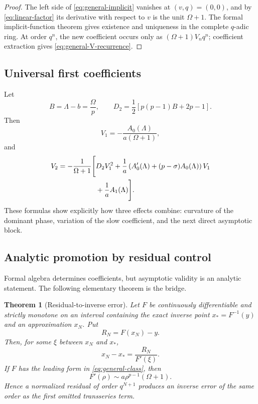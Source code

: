 \documentclass[11pt,a4paper]{article}
\numberwithin{equation}{section}
\newtheorem{theorem}{Theorem}[section]
\theoremstyle{remark}
\begin{document}
\begin{proof}
The left side of \cref{eq:general-implicit} vanishes at \((v,q)=(0,0)\),
and by \cref{eq:linear-factor} its derivative with respect to \(v\) is the
unit \(\Omega+1\).  The formal implicit-function theorem gives existence and
uniqueness in the complete \(q\)-adic ring.  At order \(q^n\), the new
coefficient occurs only as \((\Omega+1)V_nq^n\); coefficient extraction gives
\cref{eq:general-V-recurrence}.
\end{proof}

\subsection{Universal first coefficients}

Let
\begin{equation}
B=\Lambda-b=\frac{\Omega}{p},
\qquad
D_2=\frac12\left[p(p-1)B+2p-1\right].
\label{eq:general-D2}
\end{equation}
Then
\begin{equation}
V_1=-\frac{A_0(\Lambda)}{a(\Omega+1)},
\label{eq:general-V1}
\end{equation}
and
\begin{align}
V_2=-\frac1{\Omega+1}\Bigg[
&D_2V_1^2
+\frac1a\left(
A_0'(\Lambda)+(p-\sigma)A_0(\Lambda)
\right)V_1
\notag\\
&+\frac1aA_1(\Lambda)
\Bigg].
\label{eq:general-V2}
\end{align}
These formulas show explicitly how three effects combine: curvature of the
dominant phase, variation of the slow coefficient, and the next direct
asymptotic block.

\subsection{Analytic promotion by residual control}

Formal algebra determines coefficients, but asymptotic validity is an
analytic statement.  The following elementary theorem is the bridge.

\begin{theorem}[Residual-to-inverse error]
\label{thm:residual-error}
Let \(F\) be continuously differentiable and strictly monotone on an interval
containing the exact inverse point \(x_*=F^{-1}(y)\) and an approximation
\(x_N\).  Put
\[
R_N=F(x_N)-y.
\]
Then, for some \(\xi\) between \(x_N\) and \(x_*\),
\begin{equation}
x_N-x_*=\frac{R_N}{F'(\xi)}.
\label{eq:residual-error}
\end{equation}
If \(F\) has the leading form in \cref{eq:general-class}, then
\begin{equation}
F'(\rho)\sim a\rho^{p-1}(\Omega+1).
\label{eq:general-derivative-scale}
\end{equation}
Hence a normalized residual of order \(q^{N+1}\) produces an inverse error
of the same order as the first omitted transseries term.
\end{theorem}
\end{document}

